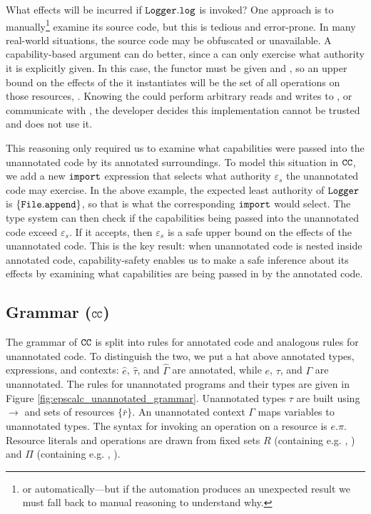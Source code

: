 What effects will be incurred if $\mathtt{Logger.log}$ is invoked? One
approach is to manually\footnote{or automatically---but if the
  automation produces an unexpected result we must fall back to manual
  reasoning to understand why.} examine its source code, but this is
tedious and error-prone. In many real-world situations, the source
code may be obfuscated or unavailable. A capability-based argument can do
better, since a  can only exercise what authority it is explicitly
given. In this case, the  functor must be given  and
, so an upper bound on the effects of the  it
instantiates will be the set of all operations on those resources,
. Knowing the  could perform
arbitrary reads and writes to , or communicate with , the developer decides this implementation cannot be trusted
and does not use it.

This reasoning only required us to examine what capabilities were passed into
the unannotated code by its annotated surroundings. To model this situation in
$\mathtt{CC}$, we add a new $\mathtt{import}$ expression
that selects what authority $\varepsilon_s$ the unannotated code may
exercise. In the above example, the expected least authority of
$\mathtt{Logger}$ is $\{ \mathtt{File.append} \}$, so that is what the
corresponding $\mathtt{import}$ would select. The type system can then
check if the capabilities being passed into the unannotated code
exceed $\varepsilon_s$. If it accepts, then $\varepsilon_s$ is a safe
upper bound on the effects of the unannotated code. This is the
key result: when unannotated code is nested inside annotated code,
capability-safety enables us to make a safe inference about its
effects by examining what capabilities are being passed in by the
annotated code.

\vspace{-0.5cm}
\subsection{Grammar ($\mathtt{CC}$)}
\vspace{-0.2cm}

The grammar of $\mathtt{CC}$ is split into rules for annotated code and
analogous rules for unannotated code. To distinguish the two, we put a
hat above annotated types, expressions, and contexts: $\hat e$,
$\hat \tau$, and $\hat \Gamma$ are annotated, while $e$, $\tau$, and
$\Gamma$ are unannotated. The rules for unannotated programs and their
types are given in Figure
\ref{fig:epscalc_unannotated_grammar}. Unannotated types $\tau$ are
built using $\rightarrow$ and sets of resources $\{ \bar r \}$. An
unannotated context $\Gamma$ maps variables to unannotated types.
The syntax for invoking an operation on a resource is $e.\pi$. Resource
literals and operations are drawn from fixed sets $R$ (containing e.g.
, ) and $\Pi$ (containing e.g. ,
).

